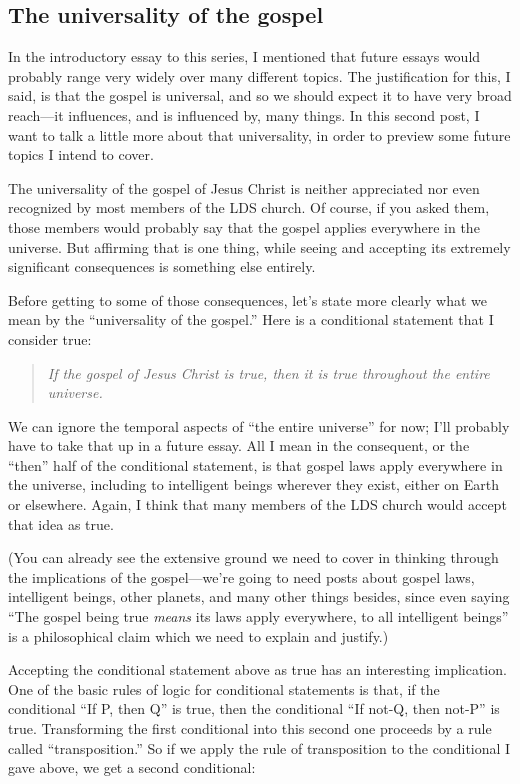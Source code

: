 \subsection{The universality of the gospel}

	In the introductory essay to this series, I mentioned that future essays would probably range very widely over many different topics. The justification for this, I said, is that the gospel is universal, and so we should expect it to have very broad reach---it influences, and is influenced by, many things. In this second post, I want to talk a little more about that universality, in order to preview some future topics I intend to cover.

	The universality of the gospel of Jesus Christ is neither appreciated nor even recognized by most members of the LDS church. Of course, if you asked them, those members would probably say that the gospel applies everywhere in the universe. But affirming that is one thing, while seeing and accepting its extremely significant consequences is something else entirely.

	Before getting to some of those consequences, let's state more clearly what we mean by the ``universality of the gospel.'' Here is a conditional statement that I consider true:

	\begin{quote}
		\textit{If the gospel of Jesus Christ is true, then it is true throughout the entire universe.}
	\end{quote}
		
	We can ignore the temporal aspects of ``the entire universe'' for now; I'll probably have to take that up in a future essay. All I mean in the consequent, or the ``then'' half of the conditional statement, is that gospel laws apply everywhere in the universe, including to intelligent beings wherever they exist, either on Earth or elsewhere. Again, I think that many members of the LDS church would accept that idea as true.

	(You can already see the extensive ground we need to cover in thinking through the implications of the gospel---we're going to need posts about gospel laws, intelligent beings, other planets, and many other things besides, since even saying ``The gospel being true \textit{means} its laws apply everywhere, to all intelligent beings'' is a philosophical claim which we need to explain and justify.)

	Accepting the conditional statement above as true has an interesting implication. One of the basic rules of logic for conditional statements is that, if the conditional ``If P, then Q'' is true, then the conditional ``If not-Q, then not-P'' is true. Transforming the first conditional into this second one proceeds by a rule called ``transposition.'' So if we apply the rule of transposition to the conditional I gave above, we get a second conditional:

